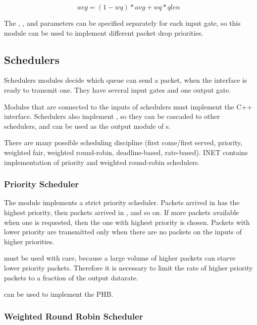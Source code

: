  $$avg = (1-wq)*avg + wq*qlen$$

The , , and  parameters
can be specified separately for each input gate, so this module
can be used to implement different packet drop priorities.

\subsection{Schedulers}

Schedulers modules decide which queue can send a packet, when the
interface is ready to transmit one. They have several input gates
and one output gate.

Modules that are connected to the inputs of schedulers must
implement the  C++ interface.
Schedulers also implement , so
they can be cascaded to other schedulers, and can be used
as the output module of s.

There are many possible scheduling discipline (first come/first served,
priority, weighted fair, weighted round-robin, deadline-based,
rate-based). INET contains implementation
of priority and weighted round-robin schedulers.

\subsubsection{Priority Scheduler}

The  module implements a strict priority
scheduler. Packets arrived in  has the highest priority,
then packets arrived in , and so on. If more packets
available when one is requested, then the one with highest priority
is chosen. Packets with lower priority are transmitted only when
there are no packets on the inputs of higher priorities.

 must be used with care, because a
large volume of higher packets can starve lower priority packets.
Therefore it is necessary to limit the rate of higher priority
packets to a fraction of the output datarate.

 can be used to implement
the  PHB.

\subsubsection*{Weighted Round Robin Scheduler}

